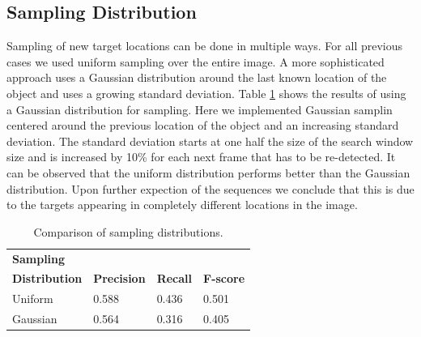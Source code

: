 \documentclass[9pt]{IEEEtran}
\begin{document}
\subsection*{Sampling Distribution}
Sampling of new target locations can be done in multiple ways.
For all previous cases we used uniform sampling over the entire image.
A more sophisticated approach uses a Gaussian distribution around the last known location of the object and uses a growing standard deviation.
Table \ref{tab:sampling_distribution} shows the results of using a Gaussian distribution for sampling.
Here we implemented Gaussian samplin centered around the previous location of the object and an increasing standard deviation.
The standard deviation starts at one half the size of the search window size and is increased by 10\% for each next frame that has to be re-detected.
It can be observed that the uniform distribution performs better than the Gaussian distribution.
Upon further expection of the sequences we conclude that this is due to the targets appearing in completely different locations in the image.
\begin{table}[!ht]
    \centering
    \begin{tabular}{llll}
        \textbf{Sampling} \\ \textbf{Distribution} & \textbf{Precision} & \textbf{Recall} & \textbf{F-score} \\ \hline
        Uniform & 0.588 & 0.436 & 0.501 \\ 
        Gaussian & 0.564 & 0.316 & 0.405 \\ 
    \end{tabular}
    \caption{Comparison of sampling distributions.}
    \label{tab:sampling_distribution}
\end{table}
\end{document}

